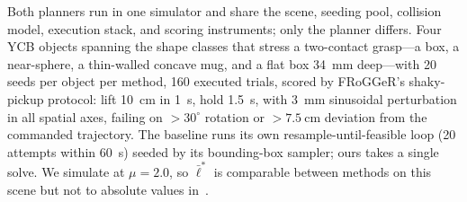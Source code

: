 Both planners run in one simulator and share the scene, seeding pool, collision
model, execution stack, and scoring instruments; only the planner differs. Four YCB
objects spanning the shape classes that stress a two-contact grasp---a box, a
near-sphere, a thin-walled concave mug, and a flat box \SI{34}{\milli\meter}
deep---with 20 seeds per object per method, 160 executed trials, scored by FRoGGeR's
shaky-pickup protocol: lift \SI{10}{\centi\meter} in \SI{1}{\second}, hold
\SI{1.5}{\second}, with \SI{3}{\milli\meter} sinusoidal perturbation in all spatial
axes, failing on $>30^\circ$ rotation or $>\SI{7.5}{\centi\meter}$ deviation from the
commanded trajectory. The baseline runs its own resample-until-feasible loop (20
attempts within \SI{60}{\second}) seeded by its bounding-box sampler; ours takes a
single solve. We simulate at $\mu = 2.0$, so $\bar{\ell}^*$ is comparable between
methods on this scene but not to absolute values in~\cite{li2023frogger}.

